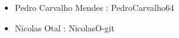 \begin{itemize}
    \item Pedro Carvalho Mendes : PedroCarvalho64  
    \item Nicolas Otal : NicolasO-git
\end{itemize}
% 
% 
% 
